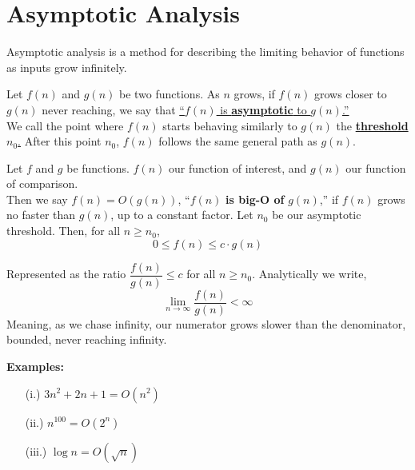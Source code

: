 \section{Asymptotic Analysis}

Asymptotic analysis is a method for describing the limiting behavior of functions as inputs grow infinitely.

\begin{Def}[Asymptotic]
    
    Let \(f(n)\) and \(g(n)\) be two functions. As \(n\) grows, if \(f(n)\) grows closer to \(g(n)\) never reaching, we say that \underline{``$f(n)$ is \textbf{asymptotic} to \(g(n)\).''}\\
    
    \noindent
    We call the point where \(f(n)\) starts behaving similarly to \(g(n)\) the \underline{\textbf{threshold} \(n_0\).} After this point $n_0$, \(f(n)\) follows the same general path as \(g(n)\).
\end{Def}

\begin{Def}

    Let $f$ and $g$ be functions. $f(n)$ our function of interest, and $g(n)$
    our function of comparison.\\

    \noindent
    Then we say $f(n)=O(g(n))$, ``$f(n)$ \textbf{is big-O of} $g(n)$,'' if $f(n)$ 
    grows no faster than $g(n)$, up to a constant factor.
    Let $n_0$ be our asymptotic threshold. Then, for all $n\geq n_0$,
    \large
    \[0\leq f(n) \leq c\cdot g(n)\]
    \normalsize
    
    \noindent
    Represented as the ratio $\dfrac{f(n)}{g(n)}\leq c$ for all $n\geq n_0$. Analytically we write,
    \Large
    \[\lim_{n\to\infty}\dfrac{f(n)}{g(n)}< \infty\]
    \normalsize
    \noindent
    Meaning, as we chase infinity, our numerator grows slower than the denominator, bounded, never reaching infinity. 
\end{Def}

\newpage

\noindent
\textbf{Examples:}
\begin{enumerate}
    \item[(i.)] $3n^2+2n+1=O(n^2)$
    \item[(ii.)] $n^{100}=O(2^n)$
    \item[(iii.)] $\log n=O(\sqrt{n})$ 
\end{enumerate}

